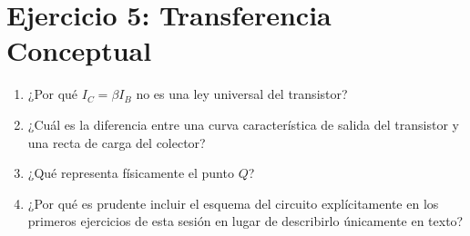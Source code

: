 \documentclass[11pt, a4paper]{article}
\begin{document}
\section*{Ejercicio 5: Transferencia Conceptual}
\begin{enumerate}
    \item ¿Por qué $I_C = \beta I_B$ no es una ley universal del transistor?
    \item ¿Cuál es la diferencia entre una curva característica de salida del transistor y una recta de carga del colector?
    \item ¿Qué representa físicamente el punto $Q$?
    \item ¿Por qué es prudente incluir el esquema del circuito explícitamente en los primeros ejercicios de esta sesión en lugar de describirlo únicamente en texto?
\end{enumerate}
\end{document}

